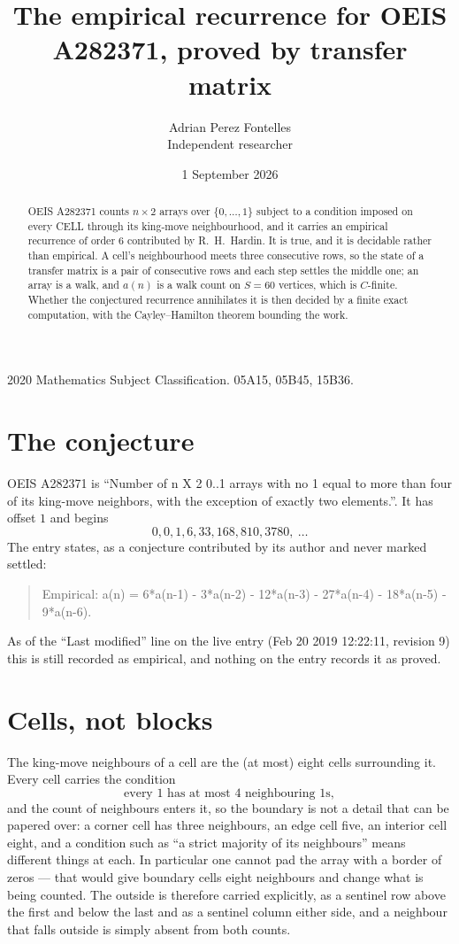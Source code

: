 \documentclass[11pt,a4paper]{article}
\title{The empirical recurrence for OEIS A282371, proved by transfer matrix}
\author{Adrian Perez Fontelles\\ \small Independent researcher}
\date{1 September 2026}
\theoremstyle{plain}
\theoremstyle{definition}
\begin{document}
\maketitle

\begin{abstract}
OEIS A282371 counts $n\times2$ arrays over $\{0,\dots,1\}$ subject to a condition imposed on
every CELL through its king-move neighbourhood, and it carries an empirical recurrence of
order $6$ contributed by R.~H.~Hardin. It is true, and it is decidable rather than
empirical. A cell's neighbourhood meets three consecutive rows, so the state of a transfer
matrix is a pair of consecutive rows and each step settles the middle one; an array is a
walk, and $a(n)$ is a walk count on $S=60$ vertices, which is $C$-finite. Whether the
conjectured recurrence annihilates it is then decided by a finite exact computation, with the
Cayley--Hamilton theorem bounding the work.
\end{abstract}

\noindent\small 2020 Mathematics Subject Classification. 05A15, 05B45, 15B36.\normalsize

\section{The conjecture}

OEIS A282371 is ``Number of n X 2 0..1 arrays with no 1 equal to more than four of its king-move neighbors, with the exception of exactly two elements.''. It has offset $1$ and begins
\[
0, 0, 1, 6, 33, 168, 810, 3780,\ \dots
\]
The entry states, as a conjecture contributed by its author and never marked settled:
\begin{quote}
Empirical: a(n) = 6*a(n-1) - 3*a(n-2) - 12*a(n-3) - 27*a(n-4) - 18*a(n-5) - 9*a(n-6).
\end{quote}
As of the ``Last modified'' line on the live entry (Feb 20 2019 12:22:11, revision 9) this is still
recorded as empirical, and nothing on the entry records it as proved.

\section{Cells, not blocks}

The king-move neighbours of a cell are the (at most) eight cells surrounding it. Every cell
carries the condition
\[
\text{every }1\text{ has at most }4\text{ neighbouring }1\text{s},
\]
and the count of neighbours enters it, so the boundary is not a detail that can be papered
over: a corner cell has three neighbours, an edge cell five, an interior cell eight, and a
condition such as ``a strict majority of its neighbours'' means different things at each. In
particular one cannot pad the array with a border of zeros --- that would give boundary cells
eight neighbours and change what is being counted. The outside is therefore carried
explicitly, as a sentinel row above the first and below the last and as a sentinel column
either side, and a neighbour that falls outside is simply absent from both counts.
\end{document}
